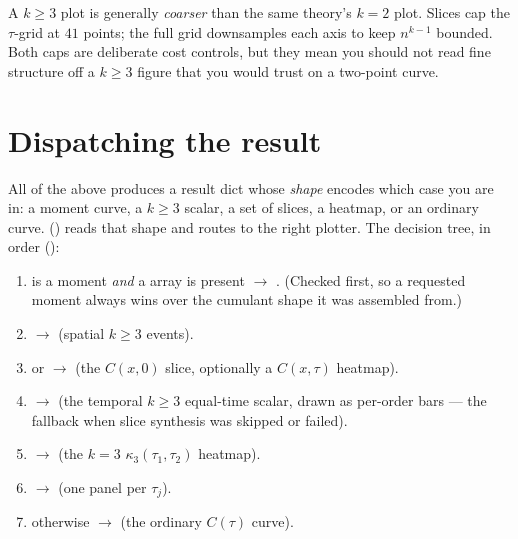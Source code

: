 \begin{gotcha}
A $k\ge3$ plot is generally \emph{coarser} than the same theory's $k=2$ plot.
Slices cap the $\tau$-grid at $41$ points; the full grid downsamples each axis to
keep $n^{k-1}$ bounded. Both caps are deliberate cost controls, but they mean you
should not read fine structure off a $k\ge3$ figure that you would trust on a
two-point curve.
\end{gotcha}

\section{Dispatching the result}\label{sec:dispatch}

All of the above produces a result dict whose \emph{shape} encodes which case you
are in: a moment curve, a $k\ge3$ scalar, a set of slices, a heatmap, or an
ordinary curve.  () reads that
shape and routes to the right plotter. The decision tree, in order
():

\begin{enumerate}
  \item {} is a moment \emph{and} a  array is present
        $\to$ . (Checked first, so a requested moment always
        wins over the cumulant shape it was assembled from.)
  \item {} $\to$  (spatial $k\ge3$
        events).
  \item {} or  $\to$
         (the $C(x,0)$ slice, optionally a $C(x,\tau)$ heatmap).
  \item {} $\to$  (the
        temporal $k\ge3$ equal-time scalar, drawn as per-order bars --- the fallback
        when slice synthesis was skipped or failed).
  \item {} $\to$
         (the $k=3$ $\kappa_3(\tau_1,\tau_2)$
        heatmap).
  \item {} $\to$
         (one panel per $\tau_j$).
  \item otherwise $\to$  (the ordinary $C(\tau)$ curve).
\end{enumerate}

